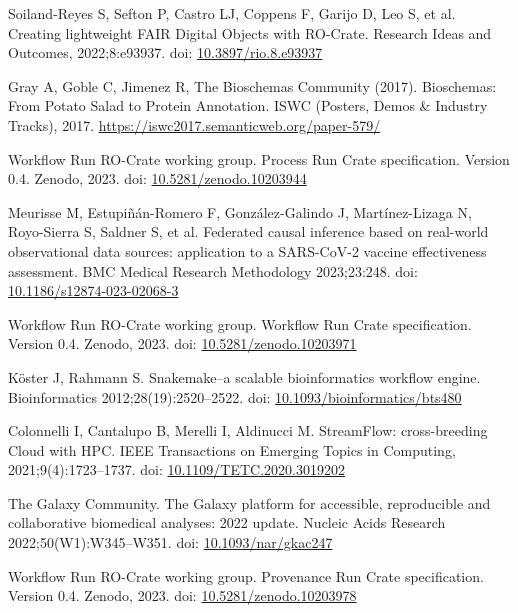 \documentclass[10pt,letterpaper]{article}
\begin{document}
\begin{thebibliography}{10}
\begin{small}
Soiland-Reyes S, Sefton P, Castro LJ, Coppens F, Garijo D, Leo S, et al.
Creating lightweight FAIR Digital Objects with RO-Crate.
Research Ideas and Outcomes, 2022;8:e93937.
doi: \href{https://doi.org/10.3897/rio.8.e93937}{10.3897/rio.8.e93937}

Gray A, Goble C, Jimenez R, The Bioschemas Community (2017).
Bioschemas: From Potato Salad to Protein Annotation.
ISWC (Posters, Demos \& Industry Tracks), 2017.
\url{https://iswc2017.semanticweb.org/paper-579/}

Workflow Run RO-Crate working group.
Process Run Crate specification. Version 0.4.
Zenodo, 2023.
doi: \href{https://doi.org/10.5281/zenodo.10203944}{10.5281/zenodo.10203944}

Meurisse M, Estupiñán-Romero F, González-Galindo J, Martínez-Lizaga N, Royo-Sierra S, Saldner S, et al.
Federated causal inference based on real-world observational data sources: application to a SARS-CoV-2 vaccine effectiveness assessment.
BMC Medical Research Methodology 2023;23:248.
doi: \href{https://doi.org/10.1186/s12874-023-02068-3}{10.1186/s12874-023-02068-3}

Workflow Run RO-Crate working group.
Workflow Run Crate specification. Version 0.4.
Zenodo, 2023.
doi: \href{https://doi.org/10.5281/zenodo.10203971}{10.5281/zenodo.10203971}

Köster J, Rahmann S.
Snakemake--a scalable bioinformatics workflow engine.
Bioinformatics 2012;28(19):2520--2522.
doi: \href{https://doi.org/10.1093/bioinformatics/bts480}{10.1093/bioinformatics/bts480}

Colonnelli I, Cantalupo B, Merelli I, Aldinucci M.
StreamFlow: cross-breeding Cloud with HPC.
IEEE Transactions on Emerging Topics in Computing, 2021;9(4):1723--1737.
doi: \href{https://doi.org/10.1109/TETC.2020.3019202}{10.1109/TETC.2020.3019202}

The Galaxy Community.
The Galaxy platform for accessible, reproducible and collaborative biomedical analyses: 2022 update.
Nucleic Acids Research 2022;50(W1):W345--W351.
doi: \href{https://doi.org/10.1093/nar/gkac247}{10.1093/nar/gkac247}

Workflow Run RO-Crate working group.
Provenance Run Crate specification. Version 0.4.
Zenodo, 2023.
doi: \href{https://doi.org/10.5281/zenodo.10203978}{10.5281/zenodo.10203978}


\end{small}
\end{thebibliography}
\end{document}
